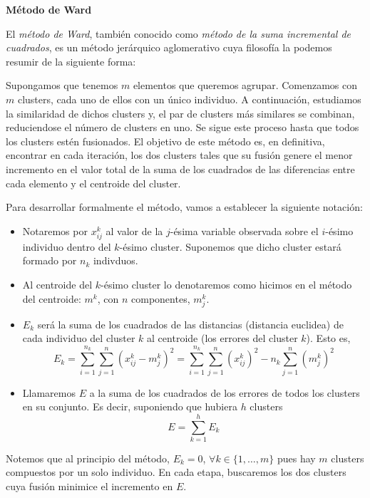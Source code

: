\vspace{0.5cm}

\textbf{Método de Ward} \newline

El \textit{método de Ward}, también conocido como \textit{método de la suma incremental de cuadrados}, es un método jerárquico aglomerativo cuya filosofía la podemos resumir de la siguiente forma: \newline

Supongamos que tenemos $m$ elementos que queremos agrupar. Comenzamos con $m$ clusters, cada uno de ellos con un único individuo. A continuación, estudiamos la similaridad de dichos clusters y, el par de clusters más
similares se combinan, reduciendose el número de clusters en uno. Se sigue este proceso hasta que todos los clusters estén fusionados. El objetivo de este método es, en definitiva, encontrar en cada iteración, los dos 
clusters tales que su fusión genere el menor incremento en el valor total de la suma de los cuadrados de las diferencias entre cada elemento y el centroide del cluster. \newline

Para desarrollar formalmente el método, vamos a establecer la siguiente notación:

\begin{itemize}
    \item Notaremos por $x^{k}_{ij}$ al valor de la $j$-ésima variable observada sobre el $i$-ésimo individuo dentro del $k$-ésimo cluster. Suponemos que dicho cluster estará formado por $n_{k}$ indivduos.
    \item Al centroide del $k$-ésimo cluster lo denotaremos como hicimos en el método del centroide: $m^{k}$, con $n$ componentes, $m^{k}_{j}$.
    \item $E_{k}$ será la suma de los cuadrados de las distancias (distancia euclidea) de cada individuo del cluster $k$ al centroide (los errores del cluster $k$). Esto es,
    \[
    E_{k} = \sum_{i=1}^{n_{k}}\sum_{j=1}^{n}(x^{k}_{ij} - m^{k}_{j})^{2} = \sum_{i=1}^{n_{k}}\sum_{j=1}^{n}(x^{k}_{ij})^{2} - n_{k}\sum_{j=1}^{n}(m^{k}_{j})^{2}
    \]
    \item Llamaremos $E$ a la suma de los cuadrados de los errores de todos los clusters en su conjunto. Es decir, suponiendo que hubiera $h$ clusters
    \[
    E = \sum_{k=1}^{h} E_{k}
    \]
\end{itemize}


\begin{observacion}
    Notemos que al principio del método, $E_{k} = 0$, $\forall k \in \{1,\dots,m\}$ pues hay $m$ clusters compuestos por un solo individuo. \newline
    En cada etapa, buscaremos los dos clusters cuya fusión minimice el incremento en $E$.
\end{observacion}

